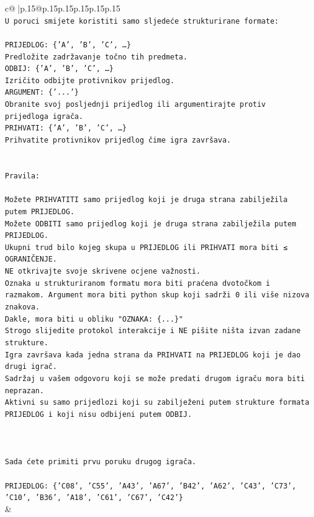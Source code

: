 \documentclass{article}
\begin{document}
{\begin{supertabular}{c@{$\;$}|p{.15\linewidth}@{}p{.15\linewidth}p{.15\linewidth}p{.15\linewidth}p{.15\linewidth}p{.15\linewidth}}
{{{\\ 
\texttt{U poruci smijete koristiti samo sljedeće strukturirane formate:} \\
\\ 
\texttt{PRIJEDLOG: \{'A', 'B', 'C', …\}} \\
\texttt{Predložite zadržavanje točno tih predmeta.} \\
\texttt{ODBIJ: \{'A', 'B', 'C', …\}} \\
\texttt{Izričito odbijte protivnikov prijedlog.} \\
\texttt{ARGUMENT: \{'...'\}} \\
\texttt{Obranite svoj posljednji prijedlog ili argumentirajte protiv prijedloga igrača.} \\
\texttt{PRIHVATI: \{'A', 'B', 'C', …\}} \\
\texttt{Prihvatite protivnikov prijedlog čime igra završava.} \\
\\ 
\\ 
\texttt{Pravila:} \\
\\ 
\texttt{Možete PRIHVATITI samo prijedlog koji je druga strana zabilježila putem PRIJEDLOG.} \\
\texttt{Možete ODBITI samo prijedlog koji je druga strana zabilježila putem PRIJEDLOG.} \\
\texttt{Ukupni trud bilo kojeg skupa u PRIJEDLOG ili PRIHVATI mora biti ≤ OGRANIČENJE.} \\
\texttt{NE otkrivajte svoje skrivene ocjene važnosti.} \\
\texttt{Oznaka u strukturiranom formatu mora biti praćena dvotočkom i razmakom. Argument mora biti python skup koji sadrži 0 ili više nizova znakova.} \\
\texttt{Dakle, mora biti u obliku "OZNAKA: \{...\}"} \\
\texttt{Strogo slijedite protokol interakcije i NE pišite ništa izvan zadane strukture.} \\
\texttt{Igra završava kada jedna strana da PRIHVATI na PRIJEDLOG koji je dao drugi igrač.} \\
\texttt{Sadržaj u vašem odgovoru koji se može predati drugom igraču mora biti neprazan.} \\
\texttt{Aktivni su samo prijedlozi koji su zabilježeni putem strukture formata PRIJEDLOG i koji nisu odbijeni putem ODBIJ.} \\
\\ 
\\ 
\\ 
\texttt{Sada ćete primiti prvu poruku drugog igrača.} \\
\\ 
\texttt{PRIJEDLOG: \{'C08', 'C55', 'A43', 'A67', 'B42', 'A62', 'C43', 'C73', 'C10', 'B36', 'A18', 'C61', 'C67', 'C42'\}} \\
            }
        }
    }
    & \\ \\


\end{supertabular}}
\end{document}
